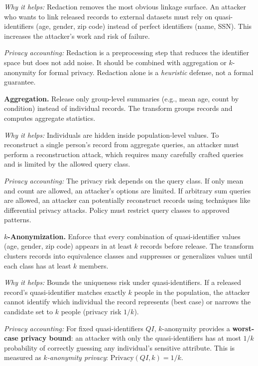 \emph{Why it helps:} Redaction removes the most obvious linkage surface. An attacker who wants to link released records to external datasets must rely on quasi-identifiers (age, gender, zip code) instead of perfect identifiers (name, SSN). This increases the attacker's work and risk of failure.

\emph{Privacy accounting:} Redaction is a preprocessing step that reduces the identifier space but does not add noise. It should be combined with aggregation or $k$-anonymity for formal privacy. Redaction alone is a \emph{heuristic} defense, not a formal guarantee.

\textbf{Aggregation.} Release only group-level summaries (e.g., mean age, count by condition) instead of individual records. The transform groups records and computes aggregate statistics.

\emph{Why it helps:} Individuals are hidden inside population-level values. To reconstruct a single person's record from aggregate queries, an attacker must perform a reconstruction attack, which requires many carefully crafted queries and is limited by the allowed query class.

\emph{Privacy accounting:} The privacy risk depends on the query class. If only mean and count are allowed, an attacker's options are limited. If arbitrary sum queries are allowed, an attacker can potentially reconstruct records using techniques like differential privacy attacks. Policy must restrict query classes to approved patterns.

\textbf{$k$-Anonymization.} Enforce that every combination of quasi-identifier values (age, gender, zip code) appears in at least $k$ records before release. The transform clusters records into equivalence classes and suppresses or generalizes values until each class has at least $k$ members.

\emph{Why it helps:} Bounds the uniqueness risk under quasi-identifiers. If a released record's quasi-identifier matches exactly $k$ people in the population, the attacker cannot identify which individual the record represents (best case) or narrows the candidate set to $k$ people (privacy risk $1/k$).

\emph{Privacy accounting:} For fixed quasi-identifiers $QI$, $k$-anonymity provides a \textbf{worst-case privacy bound}: an attacker with only the quasi-identifiers has at most $1/k$ probability of correctly guessing any individual's sensitive attribute. This is measured as \emph{$k$-anonymity privacy}: $\text{Privacy}(QI, k) = 1/k$.

